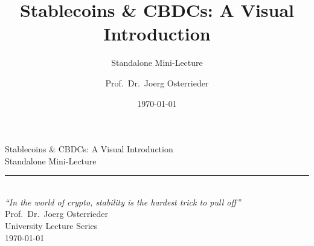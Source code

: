 \documentclass[8pt,aspectratio=169]{beamer}
\title{Stablecoins \& CBDCs: A Visual Introduction}
\subtitle{Standalone Mini-Lecture}
\author{Prof.~Dr.~Joerg Osterrieder}
\institute{University Lecture Series}
\date{\today}
\begin{document}
\begin{frame}[plain]
\vspace{2cm}
\begin{center}
{\Huge\color{mlpurple} Stablecoins \& CBDCs: A Visual Introduction}\\[0.4cm]
{\Large\color{mlblue} Standalone Mini-Lecture}\\[0.3cm]
\textcolor{mlgray}{\rule{6cm}{0.4pt}}\\[0.3cm]
{\small\itshape ``In the world of crypto, stability is the hardest trick to pull off''}\\[1.5cm]
{\normalsize Prof.~Dr.~Joerg Osterrieder}\\[0.2cm]
{\small University Lecture Series}\\[0.2cm]
{\small \today}
\end{center}
\end{frame}
\end{document}
